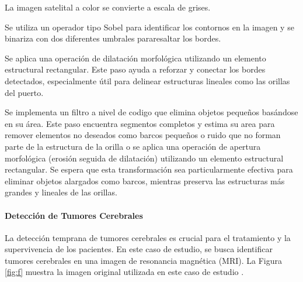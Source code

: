 \begin{seriate}

    \item La imagen satelital a color se convierte a escala de grises. 
    
    \item Se utiliza un operador tipo Sobel para identificar los contornos en la imagen y se binariza con dos diferentes umbrales pararesaltar los bordes.

    \item Se aplica una operación de dilatación morfológica utilizando un elemento estructural rectangular. Este paso ayuda a reforzar y conectar los bordes detectados, especialmente útil para delinear estructuras lineales como las orillas del puerto.
    
    \item Se implementa un filtro a nivel de codigo que elimina objetos pequeños basándose en su área. Este paso encuentra segmentos completos y estima su area para remover elementos no deseados como barcos pequeños o ruido que no forman parte de la estructura de la orilla o se aplica una operación de apertura morfológica (erosión seguida de dilatación) utilizando un elemento estructural rectangular. Se espera que esta transformación sea particularmente efectiva para eliminar objetos alargados como barcos, mientras preserva las estructuras más grandes y lineales de las orillas.
    
    \end{seriate}

\paragraph{Detección de Tumores Cerebrales} La detección temprana de tumores cerebrales es crucial para el tratamiento y la supervivencia de los pacientes. En este caso de estudio, se busca identificar tumores cerebrales en una imagen de resonancia magnética (MRI). La Figura \ref{fig:f} muestra la imagen original utilizada en este caso de estudio \autocite{BrainMRIImages}.

